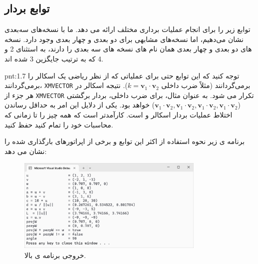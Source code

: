 \subsection{\textbf{توابع بردار}}
{
    \Large
    \begin{spacing}{1.5}
         توابع زیر را برای انجام عملیات برداری مختلف ارائه می دهد.
        ما با نسخه‌های سه‌بعدی نشان می‌دهیم، اما نسخه‌های مشابهی برای دو بعدی و چهار بعدی وجود دارد.
        نسخه های دو بعدی و چهار بعدی همان نام های نسخه های سه بعدی را دارند، به استثنای 2 و 4 که به ترتیب جایگزین 3 شده اند.
        \textbf{\vspace{6pt}}
        \lr{}
        \textbf{\vspace{-20pt}}
        \begin{point}{pnt:1.7}
            \Large
            توجه کنید که این توابع حتی برای عملیاتی که از نظر ریاضی یک اسکالر را برمی‌گردانند، \texttt{XMVECTOR} برمی‌گردانند (مثلاً ضرب داخلی $k=\textbf{v}_{1}\cdot\textbf{v}_{2}$).
            نتیجه اسکالر در هر جزء از \texttt{XMVECTOR} تکرار می شود. به عنوان مثال، برای ضرب داخلی، بردار برگشتی ($\textbf{v}_{1}\cdot\textbf{v}_{2},\textbf{v}_{1}\cdot\textbf{v}_{2},\textbf{v}_{1}\cdot\textbf{v}_{2},\textbf{v}_{1}\cdot\textbf{v}_{2}$) خواهد بود.
            یکی از دلایل این امر به حداقل رساندن اختلاط عملیات بردار اسکالر و  است.
            کارآمدتر است که همه چیز  را تا زمانی که محاسبات خود را تمام کنید حفظ کنید.
        \end{point}
        \textbf{\vspace{6pt}}
        برنامه ی زیر نحوه استفاده از اکثر این توابع و برخی از اپراتورهای بارگذاری شده را نشان می دهد:
        \textbf{\vspace{6pt}}
        \lr{}
        \textbf{\vspace{-30pt}}
        \begin{figure}[H]
            \centering
            \setlength{\belowcaptionskip}{-10pt}
            \includegraphics[width=0.8\textwidth]{Images/4/1/4.Session.1.1.19}
            \caption {خروجی برنامه ی بالا.}
            \label{fig:4.Session.1.1.19}
        \end{figure}
        \textbf{\vspace{-30pt}}


\end{spacing}}
